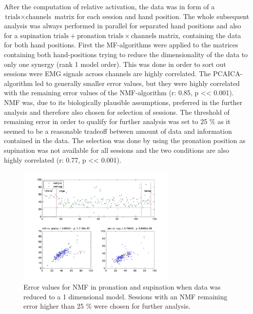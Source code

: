 After the computation of relative activation, the data was in form of a $\text{trials} \times \text{channels}$ matrix for each session and hand position. The whole subsequent analysis was always performed in parallel for separated hand positions and also for a $\text{supination trials} + \text{pronation trials} \times \text{channels}$ matrix, containing the data for both hand positions. First the MF-algorithms were applied to the matrices containing both hand-positions trying to reduce the dimensionality of the data to only one synergy (rank 1 model order). This was done in order to sort out sessions were EMG signals across channels are highly correlated. The PCAICA-algorithm led to generally smaller error values, but they were highly correlated with the remaining error values of the NMF-algorithm (r: 0.85, p << 0.001). NMF was, due to its biologically plausible assumptions, preferred in the further analysis and therefore also chosen for selection of sessions. The threshold of remaining error in order to qualify for further analysis was set to 25 \% as it seemed to be a reasonable tradeoff between amount of data and information contained in the data. The selection was done by using the pronation position as supination was not available for all sessions and the two conditions are also highly correlated (r: 0.77, p << 0.001).

\begin{figure}[ht]
	\centering
		\includegraphics[width=0.7\textwidth]{images/rank1.jpg}
	\caption{
Error values for NMF in pronation and supination when data was reduced to a 1 dimensional model. Sessions with an NMF remaining error higher than 25 \% were chosen for further analysis.
	}
	\label{sg:fig:images_rank1}
\end{figure}


